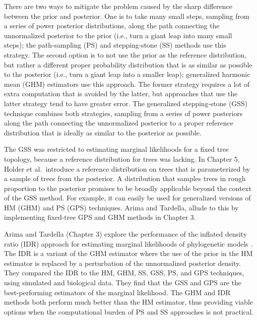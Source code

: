 \documentclass[letterpaper,12pt]{article}
\begin{document}
There are two ways to mitigate the problem caused by the sharp difference
between the prior and posterior.
One is to take many small steps, sampling from a series of power posterior
distributions, along the path connecting the unnormalized posterior to the
prior (i.e., turn a giant leap into many small steps);
the path-sampling (PS) \citep{Lartillot2006} and stepping-stone (SS)
\citep{Xie2011} methods use this strategy.
The second option is to not use the prior as the reference distribution, but
rather a different proper probability distribution that is as similar as
possible to the posterior (i.e., turn a giant leap into a smaller leap); 
generalized harmonic mean (GHM) estimators \citep{Gelfand1994} use
this approach.
The former strategy requires a lot of extra computation that is avoided by the
latter, but approaches that use the latter strategy tend to have greater error.
The generalized stepping-stone (GSS) technique \citep{Fan2011} combines both
strategies, sampling from a series of power posteriors along the path
connecting the unnormalized posterior to a proper reference distribution that
is ideally as similar to the posterior as possible.

The GSS was restricted to estimating marginal likelihoods for a fixed tree
topology, because a reference distribution for trees was lacking.
In Chapter 5, Holder et al.\ introduce a reference distribution on trees that
is parameterized by a sample of trees from the posterior.
A distribution that samples trees in rough proportion to the posterior promises
to be broadly applicable beyond the context of the GSS method.
For example, it can easily be used for generalized versions of HM (GHM) and PS
(GPS) techniques.
Arima and Tardella, allude to this by implementing fixed-tree GPS and GHM
methods in Chapter 3.


Arima and Tardella (Chapter 3) explore the performance of the inflated density
ratio (IDR) approach for estimating marginal likelihoods of phylogenetic models
\citep{Arima2012}.
The IDR is a variant of the GHM estimator where the use of the prior in the HM
estimator is replaced by a perturbation of the unnormalized posterior density.
They compared the IDR to the HM, GHM, SS, GSS, PS, and GPS techniques,
using simulated and biological data.
They find that the GSS and GPS are the best-performing estimators of the
marginal likelihood.
The GHM and IDR methods both perform much better than the HM estimator, thus
providing viable options when the computational burden of PS and SS approaches
is not practical.
\end{document}
